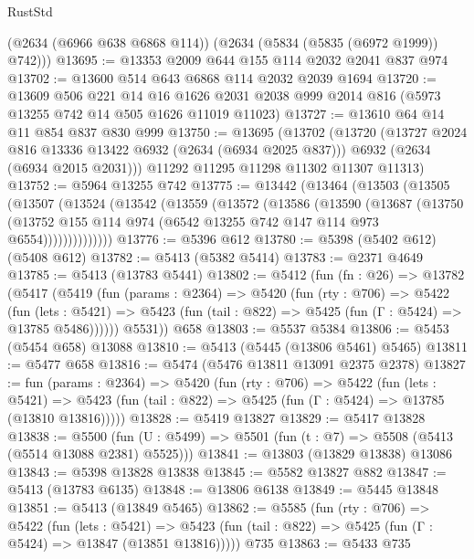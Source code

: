 \begin{lexlean}{RustStd}
\begin{coremodule}
      (@2634 (@6966 @638 @6868 @114))
      (@2634 (@5834 (@5835 (@6972 @1999)) @742)))
@13695 := @13353 @2009 @644 @155 @114 @2032 @2041 @837 @974
@13702 := @13600 @514 @643 @6868 @114 @2032 @2039 @1694
@13720 := @13609
    @506
    @221
    @14
    @16
    @1626
    @2031
    @2038
    @999
    @2014
    @816
    (@5973 @13255 @742 @14 @505 @1626 @11019 @11023)
@13727 := @13610 @64 @14 @11 @854 @837 @830 @999
@13750 := @13695
    (@13702
      (@13720
        (@13727 @2024 @816 @13336 @13422 @6932 (@2634 (@6934 @2025 @837)))
        @6932
        (@2634 (@6934 @2015 @2031)))
      @11292
      @11295
      @11298
      @11302
      @11307
      @11313)
@13752 := @5964 @13255 @742
@13775 := @13442
    (@13464
      (@13503
        (@13505
          (@13507
            (@13524
              (@13542
                (@13559
                  (@13572
                    (@13586
                      (@13590
                        (@13687
                          (@13750
                            (@13752
                              @155
                              @114
                              @974
                              (@6542 @13255 @742 @147 @114 @973 @6554))))))))))))))
@13776 := @5396 @612
@13780 := @5398 (@5402 @612) (@5408 @612)
@13782 := @5413 (@5382 @5414)
@13783 := @2371 @4649
@13785 := @5413 (@13783 @5441)
@13802 := @5412
    (fun (fn : @26) =>
    @13782
      (@5417
        (@5419
          (fun (params : @2364) =>
          @5420
            (fun (rty : @706) =>
            @5422
              (fun (lets : @5421) =>
              @5423 (fun (tail : @822) => @5425 (fun (Γ : @5424) => @13785 @5486))))))
        @5531))
    @658
@13803 := @5537 @5384
@13806 := @5453 (@5454 @658) @13088
@13810 := @5413 (@5445 (@13806 @5461) @5465)
@13811 := @5477 @658
@13816 := @5474 (@5476 @13811 @13091 @2375 @2378)
@13827 := fun (params : @2364) =>
  @5420
    (fun (rty : @706) =>
    @5422
      (fun (lets : @5421) =>
      @5423 (fun (tail : @822) => @5425 (fun (Γ : @5424) => @13785 (@13810 @13816)))))
@13828 := @5419 @13827
@13829 := @5417 @13828
@13838 := @5500
    (fun (U : @5499) => @5501 (fun (t : @7) => @5508 (@5413 (@5514 @13088 @2381) @5525)))
@13841 := @13803 (@13829 @13838) @13086
@13843 := @5398 @13828 @13838
@13845 := @5582 @13827 @882
@13847 := @5413 (@13783 @6135)
@13848 := @13806 @6138
@13849 := @5445 @13848
@13851 := @5413 (@13849 @5465)
@13862 := @5585
    (fun (rty : @706) =>
    @5422
      (fun (lets : @5421) =>
      @5423 (fun (tail : @822) => @5425 (fun (Γ : @5424) => @13847 (@13851 @13816)))))
    @735
@13863 := @5433 @735

\end{coremodule}
\end{lexlean}

